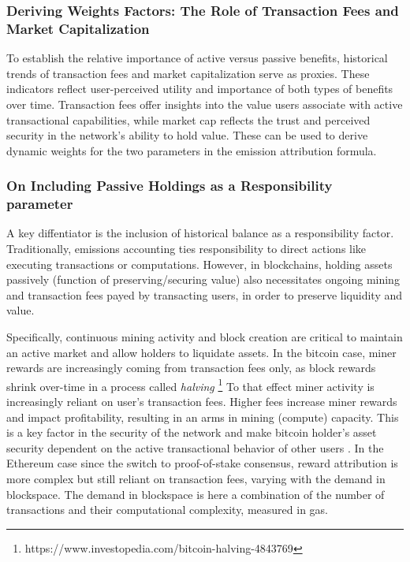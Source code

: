 \documentclass[11pt]{report}
\begin{document}
\subsubsection*{Deriving Weights Factors: The Role of Transaction Fees and Market Capitalization}
To establish the relative importance of active versus passive benefits, historical trends of transaction fees and market capitalization serve as proxies. These indicators reflect user-perceived utility and importance of both types of benefits over time. Transaction fees offer insights into the value users associate with active transactional capabilities, while market cap reflects the trust and perceived security in the network's ability to hold value. These can be used to derive dynamic weights for the two parameters in the emission attribution formula.



\subsubsection*{On Including Passive Holdings as a Responsibility parameter}
A key diffentiator is the inclusion of historical balance as a responsibility factor. Traditionally, emissions accounting ties responsibility to direct actions like executing transactions or computations.  However, in blockchains, holding assets passively (function of preserving/securing value) also necessitates ongoing mining and transaction fees payed by transacting users, in order to preserve liquidity and value.


Specifically, continuous mining activity and block creation are critical to maintain an active market and allow holders to liquidate assets. In the bitcoin case, miner rewards are increasingly coming from transaction fees only, as block rewards shrink over-time in a process called \textit{halving} \footnote{https://www.investopedia.com/bitcoin-halving-4843769} To that effect miner activity is increasingly reliant on user's transaction fees. Higher fees increase miner rewards and impact profitability, resulting in an arms in mining (compute) capacity. This is a key factor in the security of the network and make bitcoin holder's asset security dependent on the active transactional behavior of other users \cite{easleyMiningMarketsEvolution2019}. In the Ethereum case since the switch to proof-of-stake consensus, reward attribution is more complex but still reliant on transaction fees, varying with the demand in blockspace. The demand in blockspace is here a combination of the number of transactions and their computational complexity, measured in gas.
\end{document}
